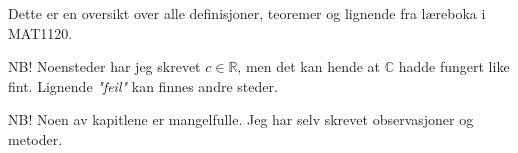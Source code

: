 Dette er en oversikt over alle definisjoner, teoremer og lignende
fra læreboka i MAT1120.

NB!
Noensteder har jeg skrevet $c\in\mathbb{R}$,
men det kan hende at $\mathbb{C}$ hadde fungert like fint.
Lignende \emph{"feil"} kan finnes andre steder.

NB!
Noen av kapitlene er mangelfulle.
Jeg har selv skrevet observasjoner og metoder.
